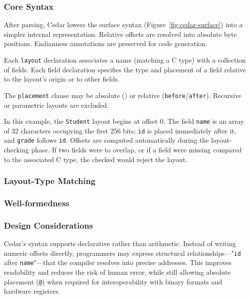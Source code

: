\subsubsection{Core Syntax}
After parsing, Cedar lowers the surface syntax (Figure~\ref{fig:cedar-surface})
into a simpler internal representation.
Relative offsets are resolved into absolute byte positions.
Endianness annotations are preserved for code generation.



Each \texttt{layout} declaration associates a name (matching a C type) with
a collection of fields. Each field declaration specifies the type and
placement of a field relative to the layout's origin
or to other fields.

The \texttt{placement} clause may be absolute (\texttt{\@}) or relative
(\texttt{before}/\texttt{after}).
Recursive or parametric layouts are excluded.

In this example, the \texttt{Student} layout begins at offset 0.
The field \texttt{name} is an array of 32 characters
occupying the first 256 bits; \texttt{id} is placed immediately
after it, and \texttt{grade} follows \texttt{id}.
Offsets are computed automatically during the layout-checking phase.
If two fields were to overlap, or if a field were missing compared
to the associated C type, the checked
would reject the layout.


\subsubsection{Layout-Type Matching}



\subsubsection{Well-formedness}





\subsubsection{Design Considerations}
Cedar's syntax supports declarative rather than arithmetic.
Instead of writing numeric offsets directly, programmers may
express structural relationships—"\texttt{id} after \texttt{name}"—that
the compiler resolves into precise addresses.
This improves readability and reduces the risk of human error, while
still allowing absolute placement (\texttt{@}) when required
for interoperability with binary formats and hardware registers.

